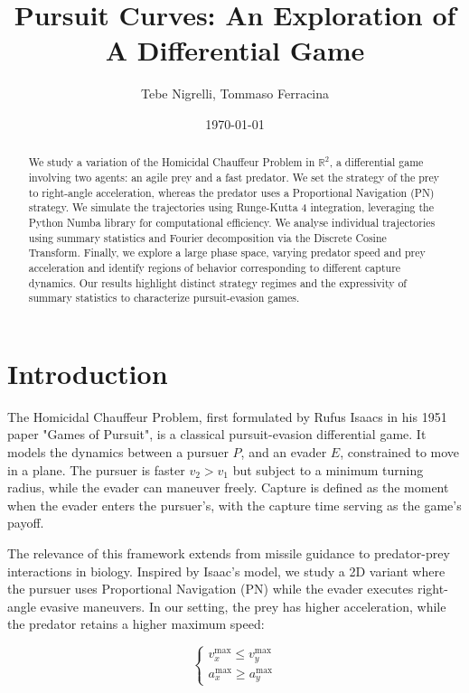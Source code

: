 \documentclass[11pt]{article}
\begin{document}
\title{Pursuit Curves: An Exploration of A Differential Game}

\author{Tebe Nigrelli, Tommaso Ferracina}
\date{\today}

\maketitle

\begin{abstract}
  We study a variation of the Homicidal Chauffeur Problem in $\mathbb{R}^2$, a differential game involving two agents: an agile prey and a fast predator. We set the strategy of the prey to right-angle acceleration, whereas the predator uses a Proportional Navigation (PN) strategy. We simulate the trajectories using Runge-Kutta 4 integration, leveraging the Python Numba library for computational efficiency. We analyse individual trajectories using summary statistics and Fourier decomposition via the Discrete Cosine Transform. Finally, we explore a large phase space, varying predator speed and prey acceleration and identify regions of behavior corresponding to different capture dynamics. Our results highlight distinct strategy regimes and the expressivity of summary statistics to characterize pursuit-evasion games.
\end{abstract}

\section{Introduction}
The Homicidal Chauffeur Problem, first formulated by Rufus Isaacs in his 1951 paper "Games of Pursuit", is a classical pursuit-evasion differential game. It models the dynamics between a pursuer $P$, and an evader $E$, constrained to move in a plane. The pursuer is faster $v_2 > v_1$ but subject to a minimum turning radius, while the evader can maneuver freely. Capture is defined as the moment when the evader enters the pursuer's, with the capture time serving as the game's payoff.

The relevance of this framework extends from missile guidance to predator-prey interactions in biology. Inspired by Isaac's model, we study a 2D variant where the pursuer uses Proportional Navigation (PN) while the evader executes right-angle evasive maneuvers. In our setting, the prey has higher acceleration, while the predator retains a higher maximum speed:

\[
  \left\{
    \begin{aligned}
      v^{\text{max}}_x \leq v^{\text{max}}_y \\
      a^{\text{max}}_x \geq a^{\text{max}}_y
    \end{aligned}
    \right.
  \]
\end{document}

